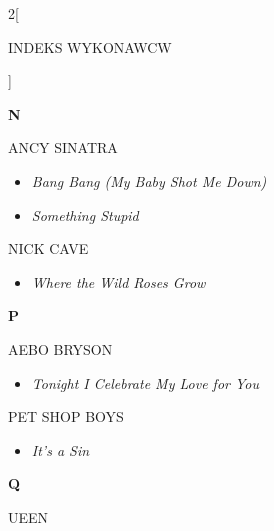 \documentclass[a4paper]{report}
\begin{document}
\begin{multicols*}{2}[\begin{Huge}INDEKS WYKONAWCW\end{Huge}\vspace{1cm}]
\begin{minipage}{\columnwidth}
\end{minipage}
\begin{minipage}{\columnwidth}
	\begin{Large}\textbf{N}\end{Large}ANCY SINATRA 
	\begin{itemize}[topsep=3pt, after=\vspace{3mm}]
		\itemsep0em
		\item[]\textit{Bang Bang (My Baby Shot Me Down)}  \\
		\item[]  \textit{Something Stupid}  \\
	\end{itemize}
\end{minipage}
\begin{minipage}{\columnwidth}
	NICK CAVE 
	\begin{itemize}[topsep=3pt, after=\vspace{3mm}]
		\itemsep0em
		\item[]\textit{Where the Wild Roses Grow}  \\
	\end{itemize}
\end{minipage}
\begin{minipage}{\columnwidth}
	\begin{Large}\textbf{P}\end{Large}AEBO BRYSON 
	\begin{itemize}[topsep=3pt, after=\vspace{3mm}]
		\itemsep0em
		\item[]\textit{Tonight I Celebrate My Love for You}  \\
	\end{itemize}
\end{minipage}
\begin{minipage}{\columnwidth}
	PET SHOP BOYS 
	\begin{itemize}[topsep=3pt, after=\vspace{3mm}]
		\itemsep0em
		\item[]\textit{It's a Sin}  \\
	\end{itemize}
\end{minipage}
\begin{minipage}{\columnwidth}
	\begin{Large}\textbf{Q}\end{Large}UEEN 
	\begin{itemize}[topsep=3pt, after=\vspace{3mm}]

\end{itemize}
\end{minipage}
\end{multicols*}
\end{document}
